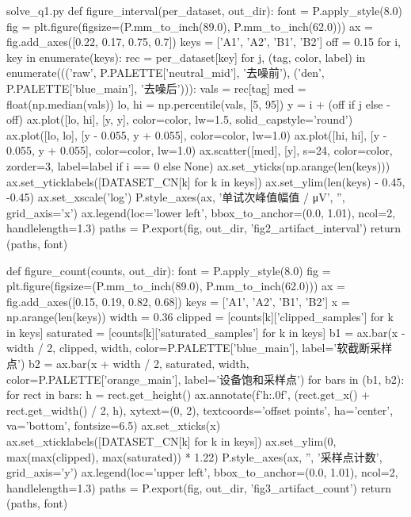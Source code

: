 \documentclass[bwprint]{gmcmthesis}
\begin{document}
\begin{appendices}
\begin{Python}{solve\_q1.py}
def figure_interval(per_dataset, out_dir):
    font = P.apply_style(8.0)
    fig = plt.figure(figsize=(P.mm_to_inch(89.0), P.mm_to_inch(62.0)))
    ax = fig.add_axes([0.22, 0.17, 0.75, 0.7])
    keys = ['A1', 'A2', 'B1', 'B2']
    off = 0.15
    for i, key in enumerate(keys):
        rec = per_dataset[key]
        for j, (tag, color, label) in enumerate((('raw', P.PALETTE['neutral_mid'], '去噪前'), ('den', P.PALETTE['blue_main'], '去噪后'))):
            vals = rec[tag]
            med = float(np.median(vals))
            lo, hi = np.percentile(vals, [5, 95])
            y = i + (off if j else -off)
            ax.plot([lo, hi], [y, y], color=color, lw=1.5, solid_capstyle='round')
            ax.plot([lo, lo], [y - 0.055, y + 0.055], color=color, lw=1.0)
            ax.plot([hi, hi], [y - 0.055, y + 0.055], color=color, lw=1.0)
            ax.scatter([med], [y], s=24, color=color, zorder=3, label=label if i == 0 else None)
    ax.set_yticks(np.arange(len(keys)))
    ax.set_yticklabels([DATASET_CN[k] for k in keys])
    ax.set_ylim(len(keys) - 0.45, -0.45)
    ax.set_xscale('log')
    P.style_axes(ax, '单试次峰值幅值 / μV', '', grid_axis='x')
    ax.legend(loc='lower left', bbox_to_anchor=(0.0, 1.01), ncol=2, handlelength=1.3)
    paths = P.export(fig, out_dir, 'fig2_artifact_interval')
    return (paths, font)

def figure_count(counts, out_dir):
    font = P.apply_style(8.0)
    fig = plt.figure(figsize=(P.mm_to_inch(89.0), P.mm_to_inch(62.0)))
    ax = fig.add_axes([0.15, 0.19, 0.82, 0.68])
    keys = ['A1', 'A2', 'B1', 'B2']
    x = np.arange(len(keys))
    width = 0.36
    clipped = [counts[k]['clipped_samples'] for k in keys]
    saturated = [counts[k]['saturated_samples'] for k in keys]
    b1 = ax.bar(x - width / 2, clipped, width, color=P.PALETTE['blue_main'], label='软截断采样点')
    b2 = ax.bar(x + width / 2, saturated, width, color=P.PALETTE['orange_main'], label='设备饱和采样点')
    for bars in (b1, b2):
        for rect in bars:
            h = rect.get_height()
            ax.annotate(f'{h:.0f}', (rect.get_x() + rect.get_width() / 2, h), xytext=(0, 2), textcoords='offset points', ha='center', va='bottom', fontsize=6.5)
    ax.set_xticks(x)
    ax.set_xticklabels([DATASET_CN[k] for k in keys])
    ax.set_ylim(0, max(max(clipped), max(saturated)) * 1.22)
    P.style_axes(ax, '', '采样点计数', grid_axis='y')
    ax.legend(loc='upper left', bbox_to_anchor=(0.0, 1.01), ncol=2, handlelength=1.3)
    paths = P.export(fig, out_dir, 'fig3_artifact_count')
    return (paths, font)


\end{Python}
\end{appendices}
\end{document}
